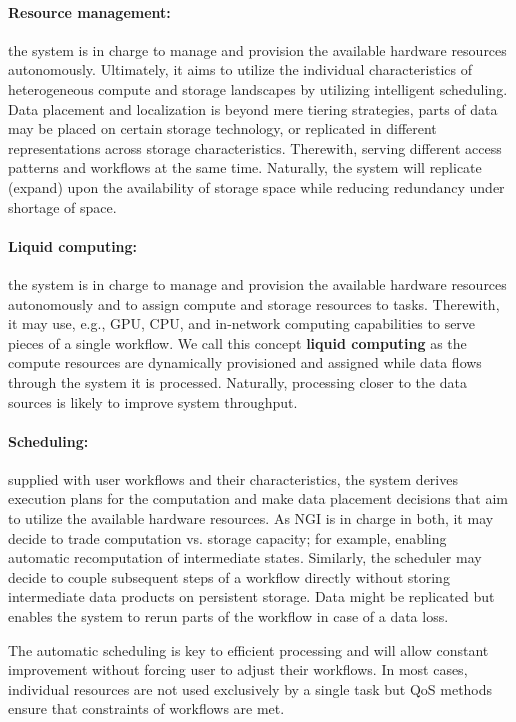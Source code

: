 \documentclass[a4paper, twocolumn]{article}
\begin{document}
\paragraph{Resource management:}
the system is in charge to manage and provision the available hardware resources autonomously.
Ultimately, it aims to utilize the individual characteristics of heterogeneous compute and storage landscapes by utilizing intelligent scheduling.
Data placement and localization is beyond mere tiering strategies, parts of data may be placed on certain storage technology, or replicated in different representations across storage characteristics.
Therewith, serving different access patterns and workflows at the same time.
Naturally, the system will replicate (expand) upon the availability of storage space while reducing redundancy under shortage of space.

\paragraph{Liquid computing:}
the system is in charge to manage and provision the available hardware resources autonomously and to assign compute and storage resources to tasks.
Therewith, it may use, e.g., GPU, CPU, and in-network computing capabilities to serve pieces of a single workflow.
We call this concept \textbf{liquid computing} as the compute resources are dynamically provisioned and assigned while data flows through the system it is processed.
Naturally, processing closer to the data sources is likely to improve system throughput.


\paragraph{Scheduling:}
supplied with user workflows and their characteristics, the system derives execution plans for the computation and make data placement decisions that aim to utilize the available hardware resources.
As NGI is in charge in both, it may decide to trade computation vs. storage capacity; for example, enabling automatic recomputation of intermediate states.
Similarly, the scheduler may decide to couple subsequent steps of a workflow directly without storing intermediate data products on persistent storage.
Data might be replicated but enables the system to rerun parts of the workflow in case of a data loss.

The automatic scheduling is key to efficient processing and will allow constant improvement without forcing user to adjust their workflows.
In most cases, individual resources are not used exclusively by a single task but QoS methods ensure that constraints of workflows are met.
\end{document}
